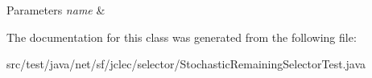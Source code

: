\begin{DoxyParams}{Parameters}
{\em name} & \\
\hline
\end{DoxyParams}


The documentation for this class was generated from the following file\-:\begin{DoxyCompactItemize}
\item 
src/test/java/net/sf/jclec/selector/Stochastic\-Remaining\-Selector\-Test.\-java\end{DoxyCompactItemize}
